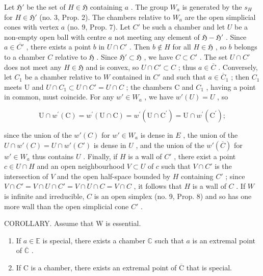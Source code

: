 Let \(\mathfrak{H}'\) be the set of \(H \in \mathfrak{H}\) containing \(a\) . The group \(W_a\) is generated by the \(s_H\) for \(H \in \mathfrak{H}'\) (no. 3, Prop. 2). The chambers relative to \(W_a\) are the open simplicial cones with vertex \(a\) (no. 9, Prop. 7). Let \(C'\) be such a chamber and let \(U\) be a non-empty open ball with centre \(a\) not meeting any element of \(\mathfrak{H} - \mathfrak{H}'\) . Since \(a \in \overline{C'}\) , there exists a point \(b\) in \(U \cap C'\) . Then \(b \notin H\) for all \(H \in \mathfrak{H}\) , so \(b\) belongs to a chamber \(C\) relative to \(\mathfrak{H}\) . Since \(\mathfrak{H}' \subset \mathfrak{H}\) , we have \(C \subset C'\) . The set \(U \cap C'\) does not meet any \(H \in \mathfrak{H}\) and is convex, so \(U \cap C' \subset C\) ; thus \(a \in \overline{C}\) . Conversely, let \(C_1\) be a chamber relative to \(W\) contained in \(C'\) and such that \(a \in \overline{C}_{1}\) ; then \(C_{1}\) meets U and \(U \cap C_{1} \subset U \cap C' = U \cap C\) ; the chambers C and \(C_{1}\) , having a point in common, must coincide. For any \(w' \in W_{a}\) , we have \(w'(U) = U\) , so

\[
\mathrm{U} \cap w ^ {\prime} (\mathrm{C}) = w ^ {\prime} (\mathrm{U} \cap \mathrm{C}) = w ^ {\prime} (\mathrm{U} \cap \mathrm{C} ^ {\prime}) = \mathrm{U} \cap w ^ {\prime} (\mathrm{C} ^ {\prime});
\]

since the union of the \(w'(C)\) for \(w' \in W_a\) is dense in \(E\) , the union of the \(U \cap w'(C) = U \cap w'(C')\) is dense in \(U\) , and the union of the \(w'(\overline{C})\) for \(w' \in W_a\) thus contains \(U\) . Finally, if \(H\) is a wall of \(C'\) , there exist a point \(c \in U \cap H\) and an open neighbourhood \(V \subset U\) of \(c\) such that \(V \cap C'\) is the intersection of \(V\) and the open half-space bounded by \(H\) containing \(C'\) ; since \(V \cap C' = V \cap U \cap C' = V \cap U \cap C = V \cap C\) , it follows that \(H\) is a wall of \(C\) . If \(W\) is infinite and irreducible, \(C\) is an open simplex (no. 9, Prop. 8) and so has one more wall than the open simplicial cone \(C'\) .

COROLLARY. Assume that W is essential.

\begin{enumerate}
\def\labelenumi{(\roman{enumi})}
\item
  If \(a \in \mathbb{E}\) is special, there exists a chamber \(\mathbb{C}\) such that \(a\) is an extremal point of \(\overline{\mathbb{C}}\) .
\item
  If \(\mathrm{C}\) is a chamber, there exists an extremal point of \(\overline{\mathrm{C}}\) that is special.
\end{enumerate}

